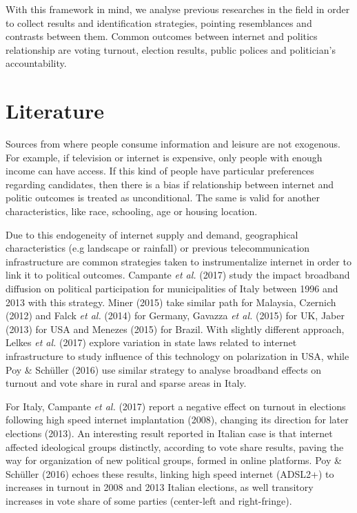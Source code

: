 \documentclass[
  12pt,
]{article}
\begin{document}
With this framework in mind, we analyse previous researches in the field
in order to collect results and identification strategies, pointing
resemblances and contrasts between them. Common outcomes between
internet and politics relationship are voting turnout, election results,
public polices and politician's accountability.

\hypertarget{literature}{%
\section{Literature}\label{literature}}

Sources from where people consume information and leisure are not
exogenous. For example, if television or internet is expensive, only
people with enough income can have access. If this kind of people have
particular preferences regarding candidates, then there is a bias if
relationship between internet and politic outcomes is treated as
unconditional. The same is valid for another characteristics, like race,
schooling, age or housing location.

Due to this endogeneity of internet supply and demand, geographical
characteristics (e.g landscape or rainfall) or previous
telecommunication infrastructure are common strategies taken to
instrumentalize internet in order to link it to political outcomes.
Campante \emph{et al.} (2017) study the impact broadband diffusion on
political participation for municipalities of Italy between 1996 and
2013 with this strategy. Miner (2015) take similar path for Malaysia,
Czernich (2012) and Falck \emph{et al.} (2014) for Germany, Gavazza
\emph{et al.} (2015) for UK, Jaber (2013) for USA and Menezes (2015) for
Brazil. With slightly different approach, Lelkes \emph{et al.} (2017)
explore variation in state laws related to internet infrastructure to
study influence of this technology on polarization in USA, while Poy \&
Schüller (2016) use similar strategy to analyse broadband effects on
turnout and vote share in rural and sparse areas in Italy.

For Italy, Campante \emph{et al.} (2017) report a negative effect on
turnout in elections following high speed internet implantation (2008),
changing its direction for later elections (2013). An interesting result
reported in Italian case is that internet affected ideological groups
distinctly, according to vote share results, paving the way for
organization of new political groups, formed in online platforms. Poy \&
Schüller (2016) echoes these results, linking high speed internet
(ADSL2+) to increases in turnout in 2008 and 2013 Italian elections, as
well transitory increases in vote share of some parties (center-left and
right-fringe).
\end{document}
